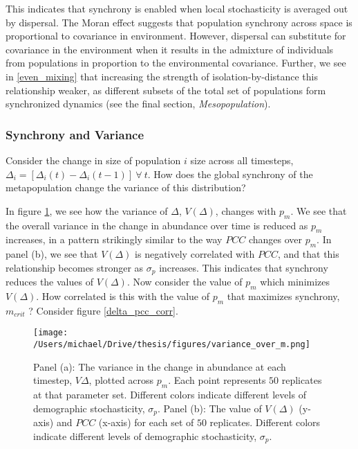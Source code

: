 This indicates that synchrony is enabled when local stochasticity is
averaged out by dispersal. The Moran effect suggests that population
synchrony across space is proportional to covariance in environment.
However, dispersal can substitute for covariance in the environment when
it results in the admixture of individuals from populations in
proportion to the environmental covariance. Further, we see in
\ref{even_mixing} that increasing the strength of isolation-by-distance
this relationship weaker, as different subsets of the total set of
populations form synchronized dynamics (see the final section,
\emph{Mesopopulation}).

\hypertarget{synchrony-and-variance}{%
\subsubsection{Synchrony and Variance}\label{synchrony-and-variance}}

Consider the change in size of population \(i\) size across all
timesteps, \(\Delta_i = [\Delta_i(t) - \Delta_i(t-1)] \ \forall \ t\).
How does the global synchrony of the metapopulation change the variance
of this distribution?

In figure \ref{variance_over_m}, we see how the variance of \(\Delta\),
\(V(\Delta)\), changes with \(p_m\). We see that the overall variance in
the change in abundance over time is reduced as \(p_m\) increases, in a
pattern strikingly similar to the way \(PCC\) changes over \(p_m\). In
panel (b), we see that \(V(\Delta)\) is negatively correlated with
\(PCC\), and that this relationship becomes stronger as \(\sigma_p\)
increases. This indicates that synchrony reduces the values of
\(V(\Delta)\). Now consider the value of \(p_m\) which minimizes
\(V(\Delta)\). How correlated is this with the value of \(p_m\) that
maximizes synchrony, \(m_{crit}\) ? Consider figure
\ref{delta_pcc_corr}.

\begin{figure}[h]

\texttt{[image: /Users/michael/Drive/thesis/figures/variance\_over\_m.png]}

\caption{Panel (a): The variance in the change in abundance at each timestep, $V\Delta$, plotted across $p_m$. Each point represents $50$ replicates at that parameter set. Different colors indicate different levels of demographic stochasticity, $\sigma_p$. Panel (b): The value of $V(\Delta)$ (y-axis) and $PCC$ (x-axis) for each set of $50$ replicates. Different colors indicate different levels of demographic stochasticity, $\sigma_p$.  }

\label{variance_over_m}

\end{figure}

